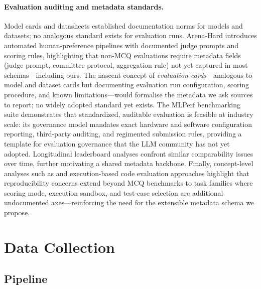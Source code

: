 \documentclass[11pt]{article}
\begin{document}
\paragraph{Evaluation auditing and metadata standards.}
Model cards \citep{mitchell-2019-modelcards} and datasheets
\citep{gebru-2021-datasheets} established documentation norms for
models and datasets; no analogous standard exists for evaluation runs.
Arena-Hard \citep{li-2024-arenahard} introduces automated
human-preference pipelines with documented judge prompts and scoring
rules, highlighting that non-MCQ evaluations require metadata fields
(judge prompt, committee protocol, aggregation rule) not yet captured
in most schemas---including ours.
The nascent concept of \emph{evaluation cards}---analogous to model
and dataset cards but documenting evaluation run configuration,
scoring procedure, and known limitations---would formalise the metadata
we ask sources to report; no widely adopted standard yet exists.
The MLPerf benchmarking suite \citep{mattson-2020-mlperf}
demonstrates that standardized, auditable evaluation is feasible
at industry scale: its governance model mandates exact hardware
and software configuration reporting, third-party auditing, and
regimented submission rules, providing a template for evaluation
governance that the LLM community has not yet adopted.
Longitudinal leaderboard analyses \citep{son-2024-koopenllm}
confront similar comparability issues over time, further motivating
a shared metadata backbone.
Finally, concept-level analyses such as
\citet{perlitz-2024-competencygaps} and execution-based code
evaluation approaches \citep{jackal-2024} highlight that
reproducibility concerns extend beyond MCQ benchmarks to task
families where scoring mode, execution sandbox, and test-case
selection are additional undocumented axes---reinforcing the need
for the extensible metadata schema we propose.

\section{Data Collection}

\subsection{Pipeline}
\end{document}
